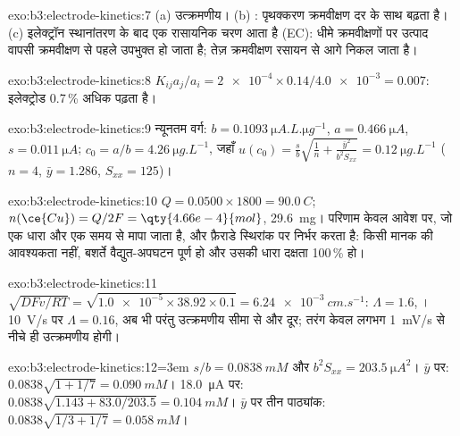 \begin{solution}{exo:b3:electrode-kinetics:7}
(a) उत्क्रमणीय। (b) : पृथक्करण क्रमवीक्षण दर के साथ बढ़ता है।
(c) इलेक्ट्रॉन स्थानांतरण के बाद एक रासायनिक चरण आता है (EC): धीमे क्रमवीक्षणों पर
उत्पाद वापसी क्रमवीक्षण से पहले उपभुक्त हो जाता है; तेज़ क्रमवीक्षण रसायन से आगे निकल जाता है।
\end{solution}

\begin{solution}{exo:b3:electrode-kinetics:8}
$K_{ij}a_j/a_i = \num{2e-4} \times 0.14/\num{4.0e-3} = 0.007$: इलेक्ट्रोड 0.7\,\% अधिक पढ़ता है।
\end{solution}

\begin{solution}{exo:b3:electrode-kinetics:9}
न्यूनतम वर्ग: $b = \qty{0.1093}{\micro A.L.\micro g^{-1}}$, $a = \qty{0.466}{\micro A}$, $s = \qty{0.011}{\micro A}$; $c_0 = a/b =
\qty{4.26}{\micro g.L^{-1}}$, जहाँ $u(c_0) = \frac sb\sqrt{\frac1n + \frac{\bar y^2}{b^2S_{xx}}} = \qty{0.12}{\micro g.L^{-1}}$
($n = 4$, $\bar y = 1.286$, $S_{xx} = 125$)।
\end{solution}

\begin{solution}{exo:b3:electrode-kinetics:10}
$Q = 0.0500 \times 1800 = \qty{90.0}{C}$; $n(\ce{Cu}) = Q/2F = \qty{4.66e-4}{mol}$, \qty{29.6}{mg}।
परिणाम केवल आवेश पर, जो एक धारा और एक समय से मापा जाता है, और
फ़ैराडे स्थिरांक पर निर्भर करता है: किसी मानक की आवश्यकता नहीं, बशर्ते वैद्युत-अपघटन
पूर्ण हो और उसकी धारा दक्षता 100\,\% हो।
\end{solution}

\begin{solution}{exo:b3:electrode-kinetics:11}
$\sqrt{DFv/RT} = \sqrt{\num{1.0e-5} \times 38.92 \times 0.1} = \qty{6.24e-3}{cm.s^{-1}}$: $\Lambda = 1.6$, ।
\qty{10}{V/s} पर $\Lambda = 0.16$, अब भी  परंतु उत्क्रमणीय सीमा से
और दूर; तरंग केवल लगभग \qty{1}{mV/s} से नीचे ही उत्क्रमणीय होगी।
\end{solution}

\begin{solution}{exo:b3:electrode-kinetics:12}\emergencystretch=3em
$s/b = \qty{0.0838}{mM}$ और $b^2S_{xx} = \qty{203.5}{\micro A^2}$। $\bar y$ पर: $0.0838\sqrt{1 + 1/7} = \qty{0.090}{mM}$।
\qty{18.0}{\micro A} पर: $0.0838\sqrt{1.143 + 83.0/203.5} = \qty{0.104}{mM}$। $\bar y$ पर तीन पाठ्यांक:
$0.0838\sqrt{1/3 + 1/7} = \qty{0.058}{mM}$।
\end{solution}

